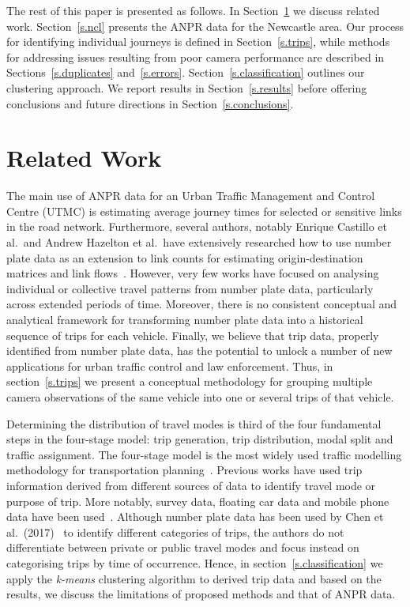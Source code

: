 The rest of this paper is presented as follows. In Section~\ref{s.related} we discuss related work. Section~\ref{s.ncl} presents the ANPR data for the Newcastle area. Our process for identifying individual journeys is defined in Section~\ref{s.trips}, while methods for addressing issues resulting from poor camera performance are described in Sections~\ref{s.duplicates} and~\ref{s.errors}. Section~\ref{s.classification} outlines our clustering approach. We report results in Section~\ref{s.results} before offering conclusions and future directions in Section~\ref{s.conclusions}.

\section{Related Work}
\label{s.related}

The main use of ANPR data for an Urban Traffic Management and Control Centre (UTMC) is estimating average journey times for selected or sensitive links in the road network. Furthermore, several authors, notably Enrique Castillo et al.\ and Andrew Hazelton et al.\, have extensively researched how to use number plate data as an extension to link counts for estimating origin-destination matrices and link flows~\cite{Castillo2010, Castillo2008, Hazelton2012}. However, very few works have focused on analysing individual or collective travel patterns from number plate data, particularly across extended periods of time. Moreover, there is no consistent conceptual and analytical framework for transforming number plate data into a historical sequence of trips for each vehicle. Finally, we believe that trip data, properly identified from number plate data, has the potential to unlock a number of new applications for urban traffic control and law enforcement. Thus, in section~\ref{s.trips} we present a conceptual methodology for grouping multiple camera observations of the same vehicle into one or several trips of that vehicle.

Determining the distribution of travel modes is third of the four fundamental steps in the four-stage model: trip generation, trip distribution, modal split and traffic assignment. The four-stage model is the most widely used traffic modelling methodology for transportation planning~\cite{FourStepModel}. Previous works have used trip information derived from different sources of data to identify travel mode or purpose of trip. More notably, survey data, floating car data and mobile phone data have been used~\cite{ODMobileData, ClusteringGPS}.  Although number plate data has been used by Chen et al.\ (2017)~\cite{Clustering} to identify different categories of trips, the authors do not differentiate between private or public travel modes and focus instead on categorising trips by time of occurrence. Hence, in section~\ref{s.classification} we apply the \emph{k-means} clustering algorithm to derived trip data and based on the results, we discuss the limitations of proposed methods and that of ANPR data.

